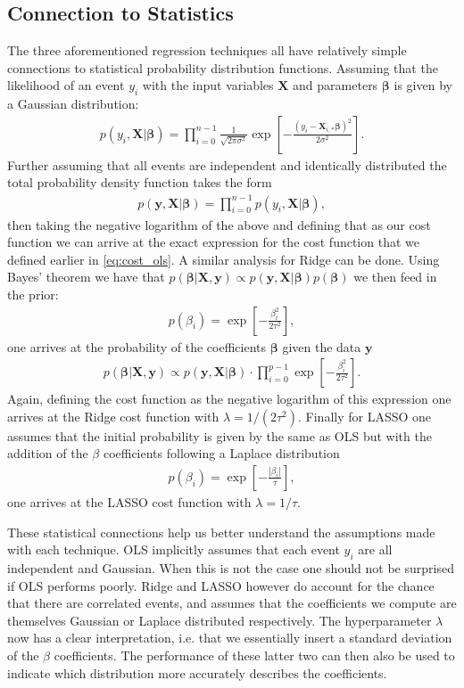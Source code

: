 \documentclass[%
reprint,
amsmath,amssymb,
aps,
pra,
]{revtex4-2}
\begin{document}
\subsection{Connection to Statistics}
The three aforementioned regression techniques all have relatively simple connections to statistical probability distribution functions. Assuming that the likelihood of an event $y_i$ with the input variables $\bm X$ and parameters $\bm\beta$ is given by a Gaussian distribution:
\begin{align}
	p(y_i,\bm X|\bm\beta)=\prod_{i=0}^{n-1}\frac{1}{\sqrt{2\pi\sigma^2}}\exp\left[-\frac{(y_i-\bm X_{i,*}\bm\beta)^2}{2\sigma^2}\right].
\end{align}
Further assuming that all events are independent and identically distributed the total probability density function takes the form
\begin{align}
	p(\bm y,\bm X|\bm\beta)=\prod_{i=0}^{n-1}p(y_i,\bm X|\bm\beta),
\end{align}
then taking the negative logarithm of the above and defining that as our cost function we can arrive at the exact expression for the cost function that we defined earlier in \eqref{eq:cost_ols}. A similar analysis for Ridge can be done. Using Bayes' theorem we have that $p(\bm\beta|\bm X,\bm y)\propto p(\bm y,\bm X|\bm\beta)p(\bm\beta)$ we then feed in the prior:
\begin{align}
	p(\beta_i)=\exp\left[-\frac{\beta_i^2}{2\tau^2}\right],
\end{align}
one arrives at the probability of the coefficients $\bm\beta$ given the data $\bm y$
\begin{align}
	p(\bm\beta|\bm X,\bm y)\propto p(\bm y,\bm X|\bm\beta)\cdot\prod_{i=0}^{p-1}\exp\left[-\frac{\beta_i^2}{2\tau^2}\right].
\end{align}
Again, defining the cost function as the negative logarithm of this expression one arrives at the Ridge cost function with $\lambda=1/(2\tau^2)$. Finally for LASSO one assumes that the initial probability is given by the same as OLS but with the addition of the $\beta$ coefficients following a Laplace distribution
\begin{align}
	p(\beta_i)=\exp\left[-\frac{|\beta_i|}{\tau}\right],
\end{align}
one arrives at the LASSO cost function with $\lambda=1/\tau$. 

These statistical connections help us better understand the assumptions made with each technique. OLS implicitly assumes that each event $y_i$ are all independent and Gaussian. When this is not the case one should not be surprised if OLS performs poorly. Ridge and LASSO however do account for the chance that there are correlated events, and assumes that the coefficients we compute are themselves Gaussian or Laplace distributed respectively. The hyperparameter $\lambda$ now has a clear interpretation, i.e. that we essentially insert a standard deviation of the $\beta$ coefficients. The performance of these latter two can then also be used to indicate which distribution more accurately describes the coefficients.
\end{document}
